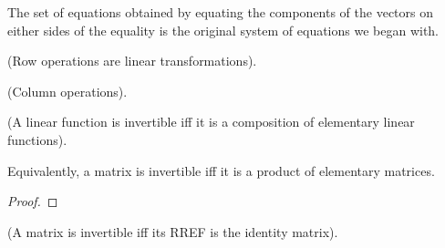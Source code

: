 \begin{deriv}
The set of equations obtained by equating the components of the vectors on either sides of the equality is the original system of equations we began with.

\end{deriv}

\begin{theorem}
    (Row operations are linear transformations).
\end{theorem}

\begin{remark}
    (Column operations).
\end{remark}

\begin{comment}
    \begin{lemma}
        (The rows of an invertible matrix form a basis for $K^n$).
        
        Suppose $\AA$ is an $n \times n$ matrix with entries in a field $K$. If $\AA$ is invertible, then it has a trivial kernel, and so by considering the equation $\AA \vv = \mathbf{0} \iff \sum_i v_i \aa_i = \mathbf{0}$ we see that $\AA$ has $n$ linearly independent columns, i.e., the columns of $\AA$ form a basis for $K^n$.
        
        If $\AA$ is invertible, then $\AA^\top$ is also invertible (with $(\AA^\top)^{-1} = (\AA^{-1})^\top$). And if $\AA^\top$ is invertible, then the columns of $\AA^\top$ (i.e. the rows of $\AA$ form a basis for $K^n$).
        
        In all, we see that if $\AA$ is invertible, then the rows of $\AA$ form a basis for $K^n$ and the columns of $\AA$ also form a basis for $K^n$.
    \end{lemma}
\end{comment}

\begin{lemma}
    (A linear function is invertible iff it is a composition of elementary linear functions).
    
    Equivalently, a matrix is invertible iff it is a product of elementary matrices.
\end{lemma}

\begin{proof}
   
\end{proof}

\begin{theorem}
    (A matrix is invertible iff its RREF is the identity matrix).
\end{theorem}

